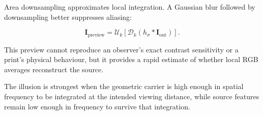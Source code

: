 Area downsampling approximates local integration. A Gaussian blur followed by downsampling better suppresses aliasing:

\begin{equation}
\mathbf{I}_{\mathrm{preview}}=
\mathcal{U}_k\left[
\mathcal{D}_k\left(h_{\sigma}*\mathbf{I}_{\mathrm{out}}\right)
\right].
\end{equation}

This preview cannot reproduce an observer's exact contrast sensitivity or a print's physical behaviour, but it provides a rapid estimate of whether local RGB averages reconstruct the source.

\begin{principlebox}
The illusion is strongest when the geometric carrier is high enough in spatial frequency to be integrated at the intended viewing distance, while source features remain low enough in frequency to survive that integration.
\end{principlebox}

\clearpage
